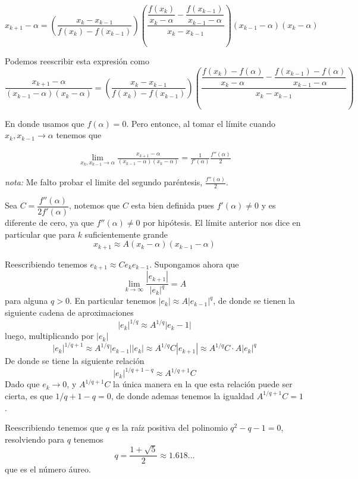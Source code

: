 \begin{problema}
\begin{enumerate}[label=\alph*)]
    \begin{equation*}
        x_{k+1}-\alpha=\left(\frac{x_k-x_{k-1}}{f(x_k)-f(x_{k-1})}\right)\left(\frac{\dfrac{f(x_k)}{x_k-\alpha}-\dfrac{f(x_{k-1})}{x_{k-1}-\alpha}}{x_k-x_{k-1}}\right)(x_{k-1}-\alpha)(x_k-\alpha)
    \end{equation*}

    Podemos reescribir esta expresión como
    \begin{equation*}
        \frac{x_{k+1}-\alpha}{(x_{k-1}-\alpha)(x_k-\alpha)}=\left(\dfrac{x_k-x_{k-1}}{f(x_k)-f(x_{k-1})}\right)\left(\frac{\dfrac{f(x_k)-f(\alpha)}{x_k-\alpha}-\dfrac{f(x_{k-1})-f(\alpha)}{x_{k-1}-\alpha}}{x_k-x_{k-1}}\right)
    \end{equation*}

    En donde usamos que \(f(\alpha)=0\). Pero entonce, al tomar el límite cuando \(x_k, x_{k-1}\to\alpha\) tenemos que
    
    \begin{align*}
        \lim_{x_k, x_{k-1}\to\alpha} \frac{x_{k+1}-\alpha}{(x_{k-1}-\alpha)(x_k-\alpha)}=\frac{1}{f'(\alpha)}\frac{f''(\alpha)}{2}
    \end{align*}
\end{enumerate}

\textit{nota:} Me falto probar el limite del segundo paréntesis, $\frac{f''(\alpha)}{2}$.

Sea \(C=\dfrac{f''(\alpha)}{2f'(\alpha)}\), notemos que \(C\) esta bien definida pues \(f'(\alpha)\not=0\) y es diferente de cero, ya que \(f''(\alpha)\not=0\) por hipótesis. El límite anterior nos dice en particular que para \(k\) suficientemente grande 
\[x_{k+1}\approx A(x_{k}-\alpha)(x_{k-1}-\alpha)\]

Reescribiendo tenemos \(e_{k+1}\approx Ce_{k}e_{k-1}\). Supongamos ahora que
\[
\lim_{k\to\infty}\frac{|e_{k+1}|}{|e_k|^q}=A
\]
para alguna \(q>0\). En particular tenemos \(|e_{k}|\approx A|e_{k-1}|^q\), de donde se tienen la siguiente cadena de aproximaciones
\[
|e_k|^{1/q}\approx A^{1/q}|e_k-1|
\]
luego, multiplicando por \(|e_{k}|\)
\[
|e_k|^{1/q+1}\approx A^{1/q}|e_{k-1}||e_k|\approx A^{1/q}C|e_{k+1}|\approx A^{1/q}C\cdot A|e_k|^{q}
\]
De donde se tiene la siguiente relación
\[
|e_k|^{1/q+1-q}\approx A^{1/q+1}C
\]
Dado que \(e_k\to0\), y \(A^{1/q+1}C\) la única manera en la que esta relación puede ser cierta, es que \(1/q+1-q=0\), de donde ademas tenemos la igualdad \(A^{1/q+1}C=1\).

Reescribiendo tenemos que \(q\) es la raíz positiva del polinomio \(q^2-q-1=0\), resolviendo para \(q\) tenemos 
\[q=\frac{1+\sqrt{5}}{2}\approx 1.618...\] que es el número áureo.


\end{problema}
